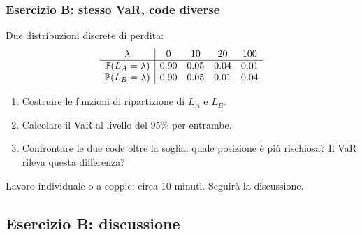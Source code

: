 \begin{frame}%
%

\frametitle{Esercizio B: stesso VaR, code diverse}%


Due distribuzioni discrete di perdita:
\[%
\begin{array}
[c]{c|cccc}%
\lambda & 0 & 10 & 20 & 100\\\hline
\Prob(L_{A}=\lambda) & 0.90 & 0.05 & 0.04 & 0.01\\
\Prob(L_{B}=\lambda) & 0.90 & 0.05 & 0.01 & 0.04
\end{array}
\]


\medskip

\begin{enumerate}
\item[1.] Costruire le funzioni di ripartizione di $L_{A}$ e $L_{B}$.

\item[2.] Calcolare il VaR al livello del $95\%$ per entrambe.

\item[3.] Confrontare le due code oltre la soglia: quale posizione \`{e}
pi\`{u} rischiosa? Il VaR rileva questa differenza?
\end{enumerate}

\medskip

\begin{center}
{\small Lavoro individuale o a coppie: circa 10 minuti. Seguir\`{a} la
discussione.}
\end{center}

%

\transboxout
\end{frame}%




\subsection{Esercizio B: discussione}%

